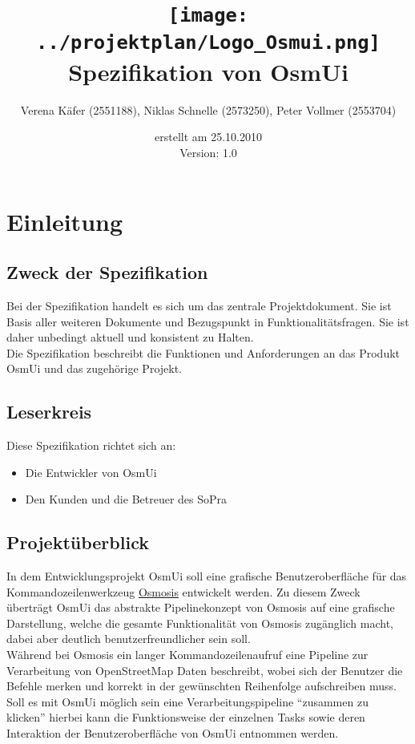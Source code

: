 \documentclass[a4paper,10pt]{scrartcl}
\author{Verena Käfer (2551188), Niklas Schnelle (2573250), Peter Vollmer (2553704)}
\date{erstellt am 25.10.2010\\
Version: 1.0}
\title{\texttt{[image: ../projektplan/Logo\_Osmui.png]} \\ 
Spezifikation von OsmUi}
\begin{document}
\maketitle
\newpage
\tableofcontents
\newpage

\section{Einleitung}
\subsection{Zweck der Spezifikation}
Bei der Spezifikation handelt es sich um das zentrale Projektdokument. Sie ist Basis aller weiteren Dokumente und
Bezugspunkt in Funktionalitätsfragen. Sie ist daher unbedingt aktuell und konsistent zu Halten.\\
Die Spezifikation beschreibt die Funktionen und Anforderungen an das Produkt OsmUi und das zugehörige Projekt.
\subsection{Leserkreis}
Diese Spezifikation richtet sich an:
\begin{itemize}
 \item Die Entwickler von OsmUi
 \item Den Kunden und die Betreuer des SoPra
\end{itemize}

\subsection{Projektüberblick}
In dem Entwicklungsprojekt OsmUi soll eine grafische Benutzeroberfläche für das Kommandozeilenwerkzeug \href{http://wiki.openstreetmap.org/wiki/Osmosis}{Osmosis}
entwickelt werden. Zu diesem Zweck überträgt OsmUi das abstrakte Pipelinekonzept von Osmosis auf eine grafische Darstellung, welche die gesamte
Funktionalität von Osmosis zugänglich macht, dabei aber deutlich benutzerfreundlicher sein soll.\\
Während bei Osmosis ein langer Kommandozeilenaufruf eine Pipeline zur Verarbeitung von OpenStreetMap Daten beschreibt, wobei sich der Benutzer die Befehle merken
und korrekt in der gewünschten Reihenfolge aufschreiben muss.\\
Soll es mit OsmUi möglich sein eine Verarbeitungspipeline ``zusammen zu klicken'' hierbei kann die Funktionsweise der einzelnen Tasks sowie deren Interaktion
der Benutzeroberfläche von OsmUi entnommen werden.
\end{document}
